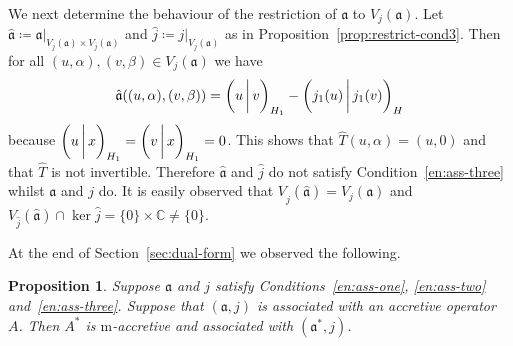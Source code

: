 \documentclass[a4paper,oneside,12pt]{amsart}
\theoremstyle{plain}
\newtheorem{proposition}[theorem]{Proposition}
\theoremstyle{definition}
\newenvironment{example}
{\pushQED{\qed}

\examplex}
{\popQED\endexamplex}
\begin{document}
\begin{example}
We next determine the behaviour of the restriction of ${{\mathfrak{{a}}}}$ to $V_j({{\mathfrak{{a}}}})$. Let ${{\mathfrak{{\hat{a}}}}}\coloneqq{\ensuremath{{{{\mathfrak{{a}}}}}|_{{V_j({{\mathfrak{{a}}}})\times V_j({{\mathfrak{{a}}}})}}}}$ and
$\hat{j}\coloneqq{\ensuremath{{j}|_{{V_j({{\mathfrak{{a}}}})}}}}$ as in Proposition~\ref{prop:restrict-cond3}. Then for all $(u,\alpha), (v,\beta)\in V_j({{\mathfrak{{a}}}})$ we have
\[
    {{\mathfrak{{\hat{a}}}}}((u,\alpha),(v,\beta))={{\ifthenelse{\equal{auto}{auto}}{\left({u}\mkern3mu{\biggm|}\mkern3mu {v}\right)}{}
\ifthenelse{\equal{auto}{b}}{\bigl({u}\mkern3mu{\biggm|}\mkern3mu {v}\bigr)}{}
\ifthenelse{\equal{auto}{B}}{\Bigl({u}\mkern3mu{\bigm|}\mkern3mu {v}\Bigr)}{}
}}_{H_1}-{{\ifthenelse{\equal{auto}{auto}}{\left({j_1(u)}\mkern3mu{\biggm|}\mkern3mu {j_1(v)}\right)}{}
\ifthenelse{\equal{auto}{b}}{\bigl({j_1(u)}\mkern3mu{\biggm|}\mkern3mu {j_1(v)}\bigr)}{}
\ifthenelse{\equal{auto}{B}}{\Bigl({j_1(u)}\mkern3mu{\bigm|}\mkern3mu {j_1(v)}\Bigr)}{}
}}_H
\]
because ${{\ifthenelse{\equal{auto}{auto}}{\left({u}\mkern3mu{\biggm|}\mkern3mu {x}\right)}{}
\ifthenelse{\equal{auto}{b}}{\bigl({u}\mkern3mu{\biggm|}\mkern3mu {x}\bigr)}{}
\ifthenelse{\equal{auto}{B}}{\Bigl({u}\mkern3mu{\bigm|}\mkern3mu {x}\Bigr)}{}
}}_{H_1}={{\ifthenelse{\equal{auto}{auto}}{\left({v}\mkern3mu{\biggm|}\mkern3mu {x}\right)}{}
\ifthenelse{\equal{auto}{b}}{\bigl({v}\mkern3mu{\biggm|}\mkern3mu {x}\bigr)}{}
\ifthenelse{\equal{auto}{B}}{\Bigl({v}\mkern3mu{\bigm|}\mkern3mu {x}\Bigr)}{}
}}_{H_1}=0$.
This shows that $\widehat{T}(u,\alpha)=(u,0)$ and that $\widehat{T}$ is not invertible.
Therefore ${{\mathfrak{{\hat{a}}}}}$ and $\hat{j}$ do not satisfy Condition~\ref{en:ass-three} whilst ${{\mathfrak{{a}}}}$ and $j$ do.
It is easily observed that $V_{\hat{j}}({{\mathfrak{{\hat{a}}}}})=V_j({{\mathfrak{{a}}}})$ and $V_{\hat{j}}({{\mathfrak{{\hat{a}}}}})\cap\ker\hat{j}=\{0\}\times{\mathbb{C}}\neq\{0\}$.
\end{example}

At the end of Section~\ref{sec:dual-form} we observed the following.
\begin{proposition}\label{prop:macc-cond3-adj}
Suppose ${{\mathfrak{{a}}}}$ and $j$ satisfy Conditions~\ref{en:ass-one}, \ref{en:ass-two} and~\ref{en:ass-three}. 
Suppose that $({{\mathfrak{{a}}}},j)$ is associated with an accretive operator~$A$.
Then $A^*$ is {\ensuremath{\text{m}}}-accretive and associated with $({{\mathfrak{{a}}}}^*,j)$.
\end{proposition}
\end{document}
